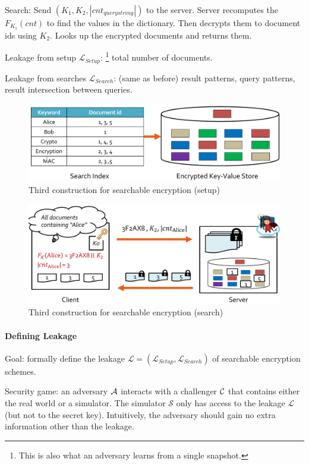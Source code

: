 Search:
Send $(K_1, K_2, |cnt_{querystring}|)$ to the server.
Server recomputes the $F_{K_1}(cnt)$ to find the values in the dictionary.
Then decrypts them to document ids using $K_2$.
Looks up the encrypted documents and returns them.

Leakage from setup $\mathcal{L}_{Setup}$:%
\footnote{This is also what an adversary learns from a single snapshot.}
total number of documents.

Leakage from searches $\mathcal{L}_{Search}$:
(same as before) result patterns, query patterns, result intersection between queries.

\begin{figure}[h]
    \centering
	\includegraphics[scale=0.4]{images/searchable-encryption-3.png}
    \caption{Third construction for searchable encryption (setup)}
    \label{fig:searchable-encryption-3}
\end{figure}
\begin{figure}[h]
    \centering
	\includegraphics[scale=0.4]{images/searchable-encryption-4.png}
    \caption{Third construction for searchable encryption (search)}
    \label{fig:searchable-encryption-4}
\end{figure}

\paragraph{Defining Leakage}
Goal: formally define the leakage $\mathcal{L} = (\mathcal{L}_{Setup}, \mathcal{L}_{Search})$ of searchable encryption schemes.

Security game: an adversary $\mathcal{A}$ interacts with a challenger $\mathcal{C}$ that contains either the real world or a simulator.
The simulator $\mathcal{S}$ only has access to the leakage $\mathcal{L}$ (but not to the secret key).
Intuitively, the adversary should gain no extra information other than the leakage.

